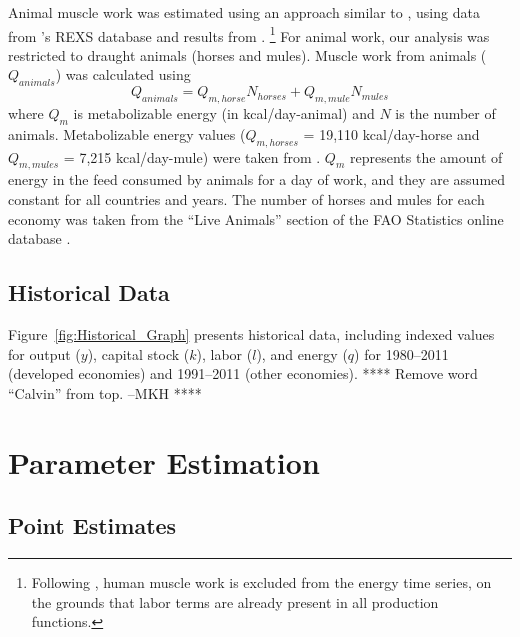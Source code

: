 \documentclass[preprint,authoryear,12pt]{elsarticle}\usepackage[]{graphicx}\usepackage[]{color}
\begin{document}
Animal muscle work was estimated using an approach 
similar to \citet{Ayres:2010ug}, using data from \citeauthor{Warr:2012a}'s
REXS database \citep{Warr:2012a} and results from 
\citet{Wirsenius:2000vi}.%
  \footnote{
  Following \citet{Ayres:2010ug}, 
  human muscle work is excluded from the energy time series,
  on the grounds that labor terms are
  already present in all production functions.
  }
For animal work, our analysis was 
restricted to draught animals (horses and mules). Muscle work 
from animals ($Q_{animals}$) was calculated using
%
\begin{equation} \label{eq:animal_muscle}
  Q_{animals} = Q_{m,horse}N_{horses} + Q_{m,mule}N_{mules}
\end{equation}
%
\noindent where $Q_m$ is metabolizable energy (in kcal/day-animal) 
and $N$ is the number of animals. Metabolizable energy values 
($Q_{m,horses}$ = 19,110 kcal/day-horse and $Q_{m,mules}$ = 
7,215 kcal/day-mule) were taken from \citet{Warr:2012a}. 
$Q_m$ represents the amount of energy in the feed consumed by 
animals for a day of work, and they are assumed constant for 
all countries and years. The number of horses and mules for 
each economy was taken from the ``Live Animals'' section of the 
FAO Statistics online database \citep{FAO:2013a}.

\subsection{Historical Data} 
\label{sec:Historical_Data}

Figure~\ref{fig:Historical_Graph} presents historical data, 
including indexed values for 
output ($y$), 
capital stock ($k$), 
labor ($l$), and 
energy ($q$) 
for 1980--2011 (developed economies) and 1991--2011 (other economies). 
**** Remove word ``Calvin'' from top. --MKH ****
%



\section{Parameter Estimation}
\label{sec:Parameter_Estimation}

\subsection{Point Estimates}
\end{document}
